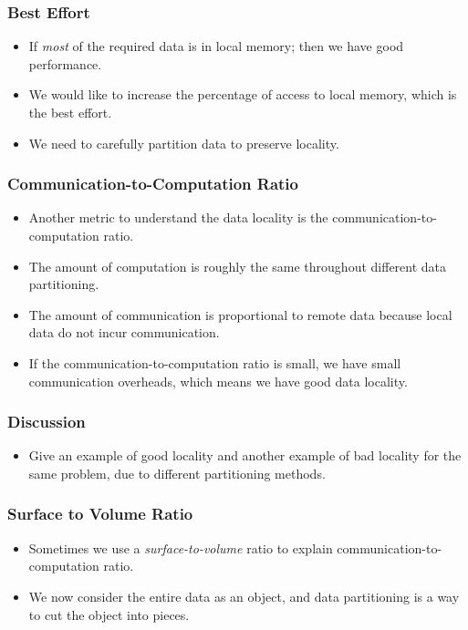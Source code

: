 \documentclass{beamer}
\begin{document}
\begin{CJK}{UTF8}{bsmi}
\begin{frame}
\frametitle{Best Effort}
\begin{itemize}
\item If {\em most} of the required data is in local memory; then we have good performance.
\item We would like to increase the percentage of access to local memory, which is the best effort.
\item We need to carefully partition data to preserve locality.
\end{itemize}
\end{frame}

\begin{frame}
\frametitle{Communication-to-Computation Ratio}
\begin{itemize}
\item Another metric to understand the data locality is the communication-to-computation ratio.
\item The amount of computation is roughly the same throughout different data partitioning.
\item The amount of communication is proportional to remote data because local data do not incur communication.
\item If the communication-to-computation ratio is small, we have small communication overheads, which means we have good data locality.
\end{itemize}
\end{frame}

\begin{frame}
\frametitle{Discussion}
\begin{itemize}
\item Give an example of good locality and another example of bad locality for the same problem, due to different partitioning methods.
\end{itemize}
\end{frame}


\begin{frame}
\frametitle{Surface to Volume Ratio}
\begin{itemize}
\item Sometimes we use a {\em surface-to-volume} ratio to explain communication-to-computation ratio.
\item We now consider the entire data as an object, and data partitioning is a way to cut the object into pieces.
\end{itemize}
\end{frame}



\end{CJK}
\end{document}
